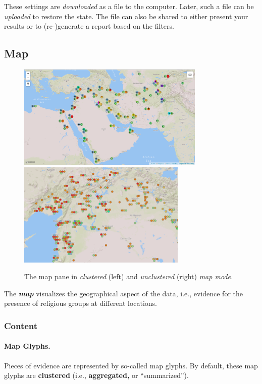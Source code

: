 These settings are \emph{downloaded} as a file to the computer.
Later, such a file can be \emph{uploaded} to restore the state.
The file can also be shared to either present your results or to (re-)generate a report based on the filters.


\subsection{Map}
\label{sec:map}

\begin{figure}[tb]
  \centering
  \includegraphics[height=5cm]{../src/assets/visualization-documentation/map-1.png}%
  \hfill%
  \includegraphics[height=5cm]{../src/assets/visualization-documentation/map-2.png}
  \caption{
    The map pane in \emph{clustered} (left) and \emph{unclustered} (right) \emph{map mode.}
  }
\end{figure}

The \textbf{\emph{map}} visualizes the geographical aspect of the data, i.e., evidence for the presence of religious groups at different locations.


\subsubsection{Content}

\paragraph{Map Glyphs.}
Pieces of evidence are represented by so-called map glyphs.
By default, these map glyphs are \textbf{clustered} (i.e., \textbf{aggregated,} or \enquote{summarized}).

